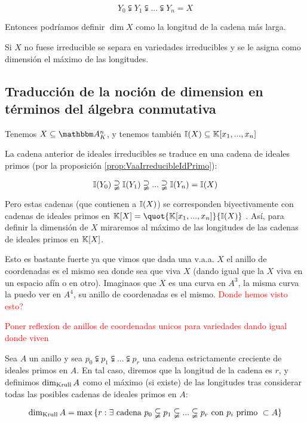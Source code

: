 $$Y_0 \subsetneqq Y_1 \subsetneqq ... \subsetneqq Y_n=X$$

Entonces podríamos definir $\dim X$ como la longitud de la cadena más larga.

Si $X$ no fuese irreducible se separa en variedades irreducibles y se le asigna como dimensión el máximo de las longitudes.

\subsection{Traducción de la noción de dimension en términos del álgebra conmutativa}

Tenemos $X \subseteq  \Akn$, y tenemos también $\mathbb{I}(X) \subseteq \mathbb{K}[x_1,...,x_n]$

La cadena anterior de ideales irreducibles se traduce en una cadena de ideales  primos (por la proposición \ref{prop:VaaIrreducibleIdPrimo}):

$$\mathbb{I}(Y_0) \supsetneqq \mathbb{I}(Y_1) \supsetneqq ... \supsetneqq \mathbb{I}(Y_n)=\mathbb{I}(X)$$

Pero estas cadenas (que contienen a $\mathbb{I}(X)$) se corresponden biyectivamente con cadenas de ideales primos en $\K[X]=\quot{\K[x_1,...,x_n]}{\I(X)}$ . Así, para definir la dimensión de $X$ miraremos al máximo de las longitudes de las cadenas  de ideales primos en $\mathbb{K}[X]$.

Esto es bastante fuerte ya que vimos que dada una v.a.a. $X$ el anillo de coordenadas es el mismo sea donde sea que viva $X$ (dando igual que la $X$ viva en un espacio afín o en otro). Imaginaos que $X$ es una curva en $A^3$, la misma curva la puedo ver en $A^4$, su anillo de coordenadas es el mismo. \textcolor{red}{Donde hemos visto esto?}

\textcolor{red}{Poner reflexion de anillos de coordenadas unicos para variedades dando igual donde viven}

\begin{defn} \label{def:DimKrull}
	Sea $A$ un anillo y sea $p_0 \subsetneqq p_1 \subsetneqq ... \subsetneqq p_r$ una cadena estrictamente creciente de ideales primos en $A$. En tal caso, diremos que la longitud de la cadena es $r$, y definimos $\dim_{\mathrm{Krull}} A$ como el máximo (si existe) de las longitudes tras considerar todas las posibles cadenas de ideales primos en $A$:

	$$ \dim_{\mathrm{Krull}} A = \max \left\{ r: \exists \text{ cadena } p_0 \subsetneqq p_1 \subsetneqq ... \subsetneqq p_r \text{ con } p_i \text{ primo } \subset A \right\} $$
\end{defn}

